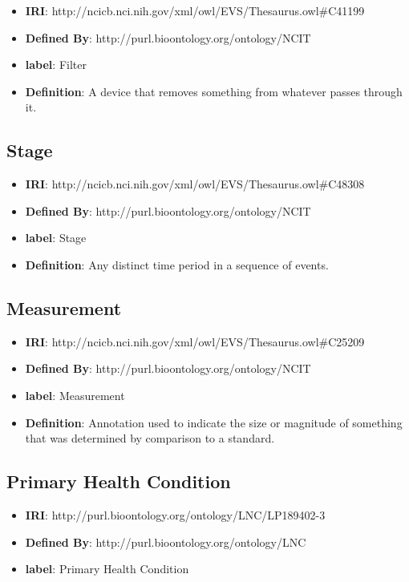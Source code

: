 \documentclass[a4paper,12pt,oneside]{article}
\begin{document}
  \begin{itemize}
     \item \textbf{IRI}: http://ncicb.nci.nih.gov/xml/owl/EVS/Thesaurus.owl\#C41199
     \item \textbf{Defined By}: http://purl.bioontology.org/ontology/NCIT
     \item \textbf{label}: Filter
     \item \textbf{Definition}: A device that removes something from whatever passes through it.
  \end{itemize}


  \subsection {Stage}

  \begin{itemize}
     \item \textbf{IRI}: http://ncicb.nci.nih.gov/xml/owl/EVS/Thesaurus.owl\#C48308
     \item \textbf{Defined By}: http://purl.bioontology.org/ontology/NCIT
     \item \textbf{label}: Stage
     \item \textbf{Definition}: Any distinct time period in a sequence of events.
  \end{itemize}


  \subsection {Measurement}

  \begin{itemize}
     \item \textbf{IRI}: http://ncicb.nci.nih.gov/xml/owl/EVS/Thesaurus.owl\#C25209
     \item \textbf{Defined By}: http://purl.bioontology.org/ontology/NCIT
     \item \textbf{label}: Measurement
     \item \textbf{Definition}: Annotation used to indicate the size or magnitude of something that was determined by comparison to a standard.
  \end{itemize}

  
  \subsection {Primary Health Condition}

  \begin{itemize}
     \item \textbf{IRI}: http://purl.bioontology.org/ontology/LNC/LP189402-3
     \item \textbf{Defined By}: http://purl.bioontology.org/ontology/LNC
     \item \textbf{label}: Primary Health Condition
  \end{itemize}
\end{document}
